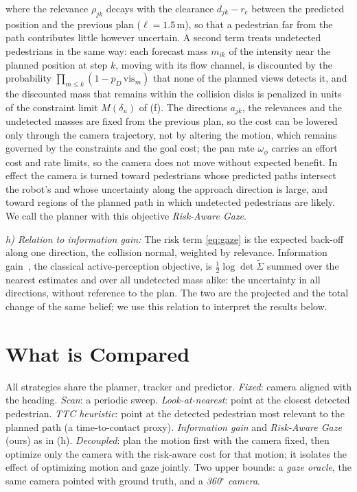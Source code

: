 \documentclass[letterpaper, 10 pt, conference]{ieeeconf}
\begin{document}
where the relevance $\rho_{jk}$ decays with the clearance $d_{jk}-r_\text{c}$ between the predicted position and the previous plan ($\ell{=}1.5$\,m), so that a pedestrian far from the path contributes little however uncertain. A second term treats undetected pedestrians in the same way: each forecast mass $m_{ik}$ of the intensity near the planned position at step $k$, moving with its flow channel, is discounted by the probability $\prod_{m\le k}(1-p_D\,\mathrm{vis}_{m})$ that none of the planned views detects it, and the discounted mass that remains within the collision disks is penalized in units of the constraint limit $M(\delta_u)$ of (f). The directions $a_{jk}$, the relevances and the undetected masses are fixed from the previous plan, so the cost can be lowered only through the camera trajectory, not by altering the motion, which remains governed by the constraints and the goal cost; the pan rate $\omega_\phi$ carries an effort cost and rate limits, so the camera does not move without expected benefit. In effect the camera is turned toward pedestrians whose predicted paths intersect the robot's and whose uncertainty along the approach direction is large, and toward regions of the planned path in which undetected pedestrians are likely. We call the planner with this objective \emph{Risk-Aware Gaze}.

\textit{h) Relation to information gain:} The risk term \eqref{eq:gaze} is the expected back-off along one direction, the collision normal, weighted by relevance. Information gain~\cite{bajcsy1988active}, the classical active-perception objective, is $\tfrac12\log\det\tilde\Sigma$ summed over the nearest estimates and over all undetected mass alike: the uncertainty in all directions, without reference to the plan. The two are the projected and the total change of the same belief; we use this relation to interpret the results below.

\section{What is Compared}
All strategies share the planner, tracker and predictor. \emph{Fixed}: camera aligned with the heading. \emph{Scan}: a periodic sweep. \emph{Look-at-nearest}: point at the closest detected pedestrian. \emph{TTC heuristic}: point at the detected pedestrian most relevant to the planned path (a time-to-contact proxy). \emph{Information gain} and \emph{Risk-Aware Gaze} (ours) as in (h). \emph{Decoupled}: plan the motion first with the camera fixed, then optimize only the camera with the risk-aware cost for that motion; it isolates the effect of optimizing motion and gaze jointly. Two upper bounds: a \emph{gaze oracle}, the same camera pointed with ground truth, and a \emph{360$^\circ$ camera}.
\end{document}
